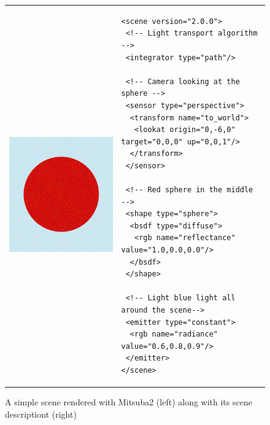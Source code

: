 \begin{figure}[httpb]
\begin{tabular}{p{}p{}}
\begin{minipage}{0.3\textwidth}
	\includegraphics[width=\linewidth]{img/example_scene.png}
\end{minipage}
	&
\begin{minipage}{0.6\textwidth}
	\lstset{language=XML}
	\begin{lstlisting}[basicstyle=\tiny]
<scene version="2.0.0">
 <!-- Light transport algorithm -->
 <integrator type="path"/>
	
 <!-- Camera looking at the sphere -->
 <sensor type="perspective">
  <transform name="to_world">
   <lookat origin="0,-6,0" target="0,0,0" up="0,0,1"/>
  </transform>
 </sensor>
	
 <!-- Red sphere in the middle -->
 <shape type="sphere">
  <bsdf type="diffuse">
   <rgb name="reflectance" value="1.0,0.0,0.0"/>
  </bsdf>
 </shape>
	
 <!-- Light blue light all around the scene-->
 <emitter type="constant">
  <rgb name="radiance" value="0.6,0.8,0.9"/>
 </emitter>
</scene>
	\end{lstlisting}
\end{minipage}
\end{tabular}
\label{fig:example_scene}
\caption{A simple scene rendered with Mitsuba2 (left) along with its scene descriptiont (right)}
\end{figure}

